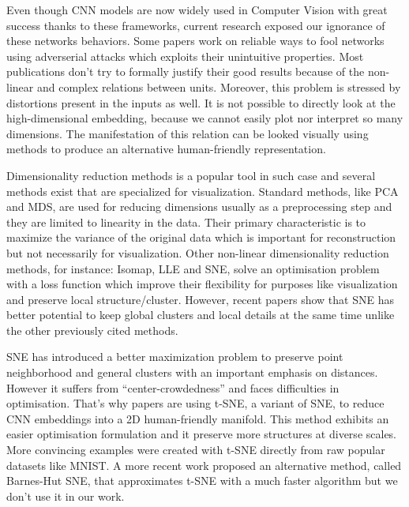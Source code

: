 \documentclass[a4paper,12pt]{report}
\begin{document}
Even though CNN models are now widely used in Computer Vision with great success thanks to these frameworks, current research exposed our ignorance of these networks behaviors.
Some papers work on reliable ways to fool networks using adverserial attacks which exploits their unintuitive properties\cite{szegedy2013intriguing}.
Most publications don't try to formally justify their good results because of the non-linear and complex relations between units. %
Moreover, this problem is stressed by distortions present in the inputs as well.
It is not possible to directly look at the high-dimensional embedding, because we cannot easily plot nor interpret so many dimensions.
The manifestation of this relation can be looked visually using methods to produce an alternative human-friendly representation.

Dimensionality reduction methods is a popular tool in such case\cite{dai2014document}\cite{taylor2011learning} and several methods exist that are specialized for visualization.
Standard methods, like PCA and MDS\cite{cox2000multidimensional}, are used for reducing dimensions usually as a preprocessing step and they are limited to linearity in the data.
Their primary characteristic is to maximize the variance of the original data which is important for reconstruction but not necessarily for visualization.
Other non-linear dimensionality reduction methods, for instance: Isomap\cite{tenenbaum2000global}, LLE\cite{roweis2000nonlinear} and SNE\cite{SNE}, solve an optimisation problem with a loss function which improve their flexibility for purposes like visualization and preserve local structure/cluster.
However, recent papers show that SNE has better potential to keep global clusters and local details at the same time unlike the other previously cited methods\cite{SNE}.

SNE has introduced a better maximization problem to preserve point neighborhood and general clusters with an important emphasis on distances\cite{SNE}.
However it suffers from ``center-crowdedness'' and faces difficulties in optimisation\cite{t-SNE}.
That's why papers are using t-SNE, a variant of SNE, to reduce CNN embeddings into a 2D human-friendly manifold. %
This method exhibits an easier optimisation formulation and it preserve more structures at diverse scales.
More convincing examples were created with t-SNE directly from raw popular datasets\cite{van2009new} like MNIST\cite{t-SNE}.
A more recent work proposed an alternative method, called Barnes-Hut SNE, that approximates t-SNE with a much faster algorithm but we don't use it in our work.
\end{document}
